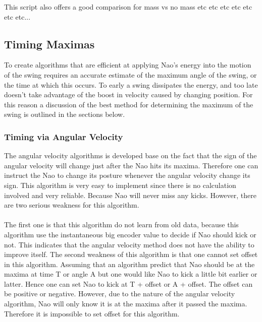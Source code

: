 \documentclass[11pt]{article}
\newcommand*\ruleline[1]{\par\noindent\raisebox{.8ex}{\makebox[\linewidth]{\hrulefill\hspace{1ex}\raisebox{-.8ex}{#1}\hspace{1ex}\hrulefill}}}
\begin{document}
This script also offers a good comparison for mass vs no mass etc etc etc etc etc etc etc...


\subsection{Timing Maximas}
\ruleline{George Sheppard}
To create algorithms that are efficient at applying Nao's energy into the motion of the swing requires an accurate estimate of the maximum angle of the swing, or the time at which this occurs. To early a swing dissipates the energy, and too late doesn't take advantage of the boost in velocity caused by changing position. For this reason a discussion of the best method for determining the maximum of the swing is outlined in the sections below.

\subsubsection{Timing via Angular Velocity}
\ruleline{Chenglong Li}
The angular velocity algorithms is developed base on the fact that the sign of the angular velocity will change just after the Nao hits its maxima. Therefore one can instruct the Nao to change its posture whenever the angular velocity change its sign. This algorithm is very easy to implement since there is no calculation involved and very reliable. Because Nao will never miss any kicks. However, there are two serious weakness for this algorithm. 
\\
\\
The first one is that this algorithm do not learn from old data, because this algorithm use the instantaneous big encoder value to decide if Nao should kick or not. This indicates that the angular velocity method does not have the ability to improve itself. The second weakness of this algorithm is that one cannot set offset in this algorithm. Assuming that an algorithm predict that Nao should be at the maxima at time T or angle A but one would like Nao to kick a little bit earlier or latter. Hence one can set Nao to kick at T + offset or A + offset. The offset can be positive or negative. However, due to the nature of the angular velocity algorithm, Nao will only know it is at the maxima after it passed the maxima. Therefore it is impossible to set offset for this algorithm. 
\end{document}
